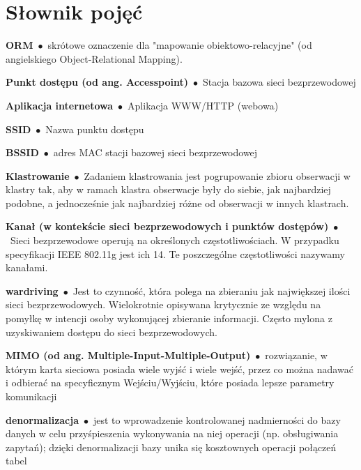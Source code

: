 \chapter*{Słownik pojęć}

\newcommand{\entry}[2]{\noindent\textbf{#1}\ $\bullet$\ {#2}}

\entry{ORM}{skrótowe oznaczenie dla "mapowanie obiektowo-relacyjne" (od angielskiego Object-Relational Mapping).}

\entry{Punkt dostępu (od ang. Accesspoint)}{Stacja bazowa sieci bezprzewodowej}

\entry{Aplikacja internetowa}{Aplikacja WWW/HTTP (webowa)}

\entry{SSID}{Nazwa punktu dostępu}

\entry{BSSID}{adres MAC stacji bazowej sieci bezprzewodowej}

\entry{Klastrowanie}{Zadaniem klastrowania jest pogrupowanie zbioru obserwacji w klastry tak, aby w ramach klastra obserwacje były do siebie, jak najbardziej podobne, a jednocześnie jak najbardziej różne od obserwacji w innych klastrach.}

\entry{Kanał (w kontekście sieci bezprzewodowych i punktów dostępów)}{Sieci bezprzewodowe operują na określonych częstotliwościach. W przypadku specyfikacji IEEE 802.11g jest ich 14. Te poszczególne częstotliwości nazywamy kanałami.}

\entry{wardriving}{Jest to czynność, która polega na zbieraniu jak największej ilości sieci bezprzewodowych. Wielokrotnie opisywana krytycznie ze względu na pomyłkę w intencji osoby wykonującej zbieranie informacji. Często mylona z uzyskiwaniem dostępu do sieci bezprzewodowych. \cite{WardrivingWiki}}

\entry{MIMO (od ang. Multiple-Input-Multiple-Output)}{rozwiązanie, w którym karta sieciowa posiada wiele wyjść i wiele wejść, przez co można nadawać i odbierać na specyficznym Wejściu/Wyjściu, które posiada lepsze parametry komunikacji}

\entry{denormalizacja}{jest to wprowadzenie kontrolowanej nadmierności do bazy danych w celu przyśpieszenia wykonywania na niej operacji (np. obsługiwania zapytań); dzięki denormalizacji bazy unika się kosztownych operacji połączeń tabel\cite{DenormalizacjaWiki}}
